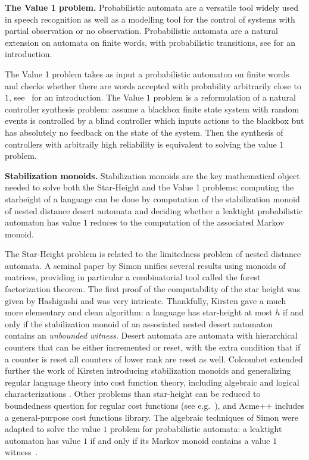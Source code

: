 \textbf{The Value 1 problem.} Probabilistic automata are a versatile tool widely used in speech recognition as well as a modelling tool for the control of systems with partial observation or no observation.
Probabilistic automata are a natural extension on automata on finite words,
with probabilistic transitions, see \cite{Rabin63} for an introduction.

The Value 1 problem takes as input a probabilistic automaton on finite words and checks whether there are words accepted with probability arbitrarily close to $1$, see~\cite{FGO12} for an introduction.
The Value $1$ problem is a reformulation of a natural controller synthesis problem:
assume a blackbox finite state system with random events
is controlled by a blind controller which inputs actions to the blackbox
but has absolutely no feedback on the state of the system.
Then the synthesis of controllers with arbitraily high reliability is equivalent to solving the value $1$ problem.



\textbf{ Stabilization monoids.} Stabilization monoids are the key mathematical object needed to solve both the Star-Height and the Value 1 problems:
computing the starheight of a language can be done by computation of the stabilization monoid of
nested distance desert automata and deciding whether a leaktight probabilistic automaton has value $1$
reduces to the computation of the associated Markov monoid.

The Star-Height problem is related to the limitedness problem of nested distance automata.
A seminal paper by Simon \cite{Sim94} unifies several results using monoids of matrices, providing in particular a combinatorial tool called the forest factorization theorem. 
The first proof of the computability of the star height was given by Hashigushi and was very intricate.
Thankfully, Kirsten gave a much more elementary and clean algorithm:
a language has star-height at most $h$ if and only if the stabilization monoid of an associated nested desert automaton contains an \emph{unbounded witness}.
Desert automata are automata with hierarchical counters that can be either incremented or reset,
with the extra condition that if a counter is reset all counters of lower rank are reset as well.
Colcombet extended further the work of Kirsten introducing stabilization monoids and generalizing regular language theory into cost function theory, including algebraic and logical characterizations \cite{Colcombet09,CKL10,Kup14}. Other problems than star-height can be reduced to boundedness question for regular cost functions (see e.g.~\cite{CL08sh,CL08b,CKLB13}), and Acme++ includes a general-purpose cost functions library.
The algebraic techniques of Simon were adapted to solve the value $1$ problem for probabilistic automata:
a leaktight automaton has value $1$ if and only if its Markov monoid
contains a value $1$ witness~\cite{FGO12}.

